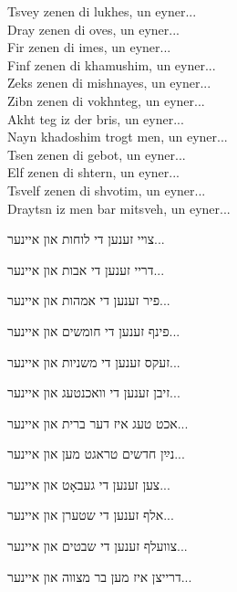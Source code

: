 \begin{minipage}[t]{0.52\linewidth}
\begin{english}
Tsvey zenen di lukhes, \hfill {\small un eyner...} \\
Dray zenen di oves, \hfill {\small un eyner...} \\
Fir zenen di imes, \hfill {\small un eyner...} \\
Finf zenen di khamushim, \hfill {\small un eyner...} \\
Zeks zenen di mishnayes, \hfill {\small un eyner...} \\
Zibn zenen di vokhnteg, \hfill {\small un eyner...} \\
Akht teg iz der bris, \hfill {\small un eyner...} \\
Nayn khadoshim trogt men, \hfill {\small un eyner...} \\
Tsen zenen di gebot, \hfill {\small un eyner...} \\
Elf zenen di shtern, \hfill {\small un eyner...}\\
Tsvelf zenen di shvotim, \hfill {\small un eyner...} \\
Draytsn iz men bar mitsveh, \hfill {\small un eyner...} \\
\end{english}
\end{minipage} \hspace{0.02\linewidth}
\begin{minipage}[t]{0.44\linewidth}
צויי זענען די לוחות
{\hfill \tiny
און איינער...
}

דריי זענען די אבות
{\hfill \tiny
און איינער...
}

פיר זענען די אמהות
{\hfill \tiny
און איינער...
}

פינף זענען די חומשים
{\hfill \tiny
און איינער...
}

זעקס זענען די משניות
{\hfill \tiny
און איינער...
}

זיבן זענען די וואכנטעג
{\hfill \tiny
און איינער...
}

אכט טעג איז דער ברית
{\hfill \tiny
און איינער...
}

נײַן חדשים טראגט מען
{\hfill \tiny
און איינער...
}

צען זענען די געבאָט
{\hfill \tiny
און איינער...
}

אלף זענען די שטערן
{\hfill \tiny
און איינער...
}

צוועלף זענען די שבטים
{\hfill \tiny
און איינער...
}

דרייצן איז מען בר מצווה
{\hfill \tiny
און איינער...
}
\end{minipage}

